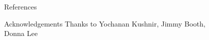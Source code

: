 \documentclass[serif,mathserif,final]{beamer}
\title{}
\author{James Doss-Gollin\inst{1,2} \quad David Farnham\inst{1,2} \quad Upmanu Lall\inst{1,2}}
\institute
{\inst{1} Columbia Water Center \quad \inst{2} Department of Earth and Environmental Engineering, Columbia University}
\begin{document}
\begin{frame}{}
  \begin{columns}[t]

    \begin{column}{0.22\linewidth}

        
        

    \end{column}%

    \begin{column}{0.22\linewidth}

        

    \end{column}%

    \begin{column}{0.22\linewidth}

      

    \end{column}%


    \begin{column}{0.22\linewidth}

      \begin{block}{References}
          \renewcommand*{\bibfont}{\footnotesize}
          \printbibliography[heading=none]
      \end{block}

      \begin{block}{Acknowledgements}
          Thanks to Yochanan Kushnir, Jimmy Booth, Donna Lee
      \end{block}

    \end{column}%

  \end{columns}
\end{frame}
\end{document}
